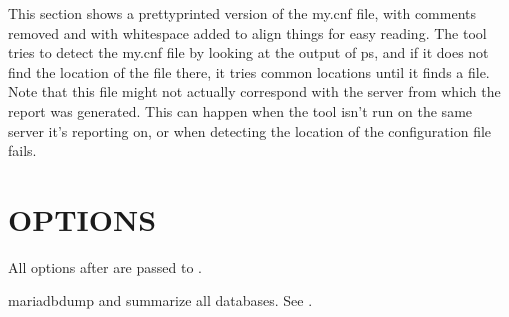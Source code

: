 \documentclass[letterpaper,10pt,english]{sphinxmanual}
\begin{document}
This section shows a pretty\sphinxhyphen{}printed version of the my.cnf file, with comments
removed and with whitespace added to align things for easy reading. The tool
tries to detect the my.cnf file by looking at the output of ps, and if it does
not find the location of the file there, it tries common locations until it
finds a file. Note that this file might not actually correspond with the server
from which the report was generated. This can happen when the tool isn’t run on
the same server it’s reporting on, or when detecting the location of the
configuration file fails.


\section{OPTIONS}
\label{\detokenize{mariadb-database-summary:options}}
All options after \textendash{} are passed to .

\begin{fulllineitems}
\label{\detokenize{mariadb-database-summary:cmdoption-mariadb-database-summary-all-databases}}
mariadb\sphinxhyphen{}dump and summarize all databases.  See {\hyperref[\detokenize{mariadb-database-summary:cmdoption-mariadb-database-summary-databases}]{}}.

\end{fulllineitems}

\end{document}
